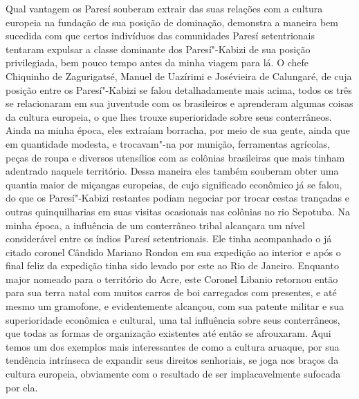 Qual vantagem os Paresí souberam extrair das suas relações com a
cultura europeia na fundação de sua posição de dominação, demonstra a
maneira bem sucedida com que certos indivíduos das comunidades Paresí
setentrionais tentaram expulsar a classe dominante dos Paresí"-Kabizi de
sua posição privilegiada, bem pouco tempo antes da minha viagem para
lá. O chefe Chiquinho de Zagurigatsé, Manuel de Uazírimi e Josévieira
de Calungaré, de cuja posição entre os Paresí"-Kabizi se falou
detalhadamente mais acima, todos os três se relacionaram em sua
juventude com os brasileiros e aprenderam algumas coisas da cultura
europeia, o que lhes trouxe superioridade sobre seus conterrâneos. Ainda
na minha época, eles extraíam borracha, por meio de sua gente, ainda
que em quantidade modesta, e trocavam"-na por munição, ferramentas
agrícolas, peças de roupa e diversos utensílios com as colônias
brasileiras que mais tinham adentrado naquele território. Dessa
maneira eles também souberam obter uma quantia maior de miçangas
europeias, de cujo significado econômico já se falou, do que os
Paresí"-Kabizi restantes podiam negociar por trocar cestas trançadas e
outras quinquilharias em suas visitas ocasionais nas colônias no rio
Sepotuba. Na minha época, a influência de um conterrâneo tribal
alcançara um nível considerável entre os índios Paresí setentrionais.
Ele tinha acompanhado o já citado coronel Cândido Mariano Rondon em sua
expedição ao interior e após o final feliz da expedição tinha sido
levado por este ao Rio de Janeiro. Enquanto major nomeado para o
território do Acre, este Coronel Libanio retornou então para sua terra
natal com muitos carros de boi carregados com presentes, e até mesmo um
gramofone, e evidentemente alcançou, com sua patente militar e sua
superioridade econômica e cultural, uma tal influência sobre seus
conterrâneos, que todas as formas de organização existentes até então
se afrouxaram. Aqui temos um dos exemplos mais interessantes de como a
cultura aruaque, por sua tendência intrínseca de expandir seus direitos
senhoriais, se joga nos braços da cultura europeia, obviamente com o
resultado de ser implacavelmente sufocada por ela.


